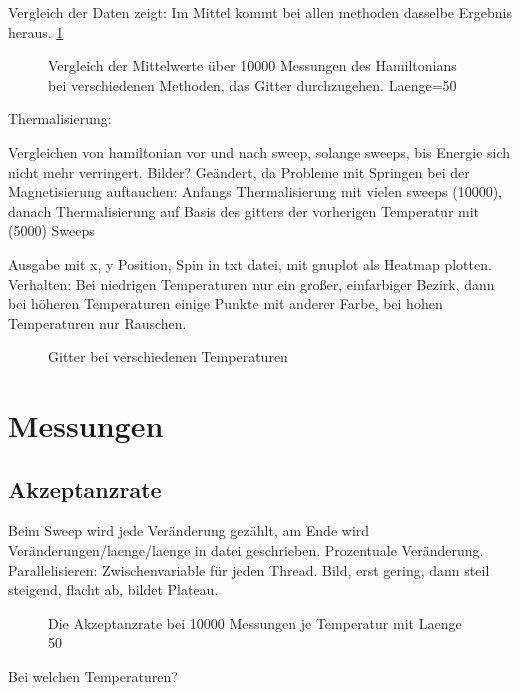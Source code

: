 \documentclass{scrreprt}
\begin{document}
	Vergleich der Daten zeigt: Im Mittel kommt bei allen methoden dasselbe Ergebnis heraus. \ref{fig:vergleichhamiltoniansweep}
	
	\begin{figure}[htbp]
	
	\label{fig:vergleichhamiltoniansweep}
		\caption{Vergleich der Mittelwerte über 10000 Messungen des Hamiltonians bei verschiedenen Methoden, das Gitter durchzugehen. Laenge=50}
	\end{figure}
	
	Thermalisierung:
	 
	Vergleichen von hamiltonian vor und nach sweep, solange sweeps, bis Energie sich nicht mehr verringert. Bilder?
	Geändert, da Probleme mit Springen bei der Magnetisierung auftauchen: Anfangs Thermalisierung mit vielen sweeps (10000), danach Thermalisierung auf Basis des gitters der vorherigen Temperatur mit (5000) Sweeps
	
	Ausgabe mit x, y Position, Spin in txt datei, mit gnuplot als Heatmap plotten.
	Verhalten: Bei niedrigen Temperaturen nur ein großer, einfarbiger Bezirk, dann bei höheren Temperaturen einige Punkte mit anderer Farbe, bei hohen Temperaturen nur Rauschen.
	
	\begin{figure}
	\begin{minipage}{0.48\textwidth}
		
	\end{minipage}
	\begin{minipage}{0.48\textwidth}
		
	\end{minipage}
	\begin{minipage}{0.48\textwidth}
		
	\end{minipage}
	\caption{Gitter bei verschiedenen Temperaturen}
	\label{fig:gitter}
	\end{figure}
	
	\section{Messungen}
	\subsection{Akzeptanzrate}
	Beim Sweep wird jede Veränderung gezählt, am Ende wird Veränderungen/laenge/laenge in datei geschrieben. Prozentuale Veränderung.
	Parallelisieren: Zwischenvariable für jeden Thread. Bild, erst gering, dann steil steigend, flacht ab, bildet Plateau.
	\begin{figure}
		
		\label{fig:akzeptanznaiv}
		\caption{Die Akzeptanzrate bei 10000 Messungen je Temperatur mit Laenge 50}
	\end{figure}
	Bei welchen Temperaturen?
\end{document}
